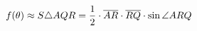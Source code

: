 \documentclass[preview]{standalone}
\begin{document}
\begin{align*}
f( \theta ) \approx S \triangle AQR = {1 \over 2} \cdot \overline{AR} \cdot \overline{RQ} \cdot \sin{\angle ARQ}
\end{align*}
\end{document}
